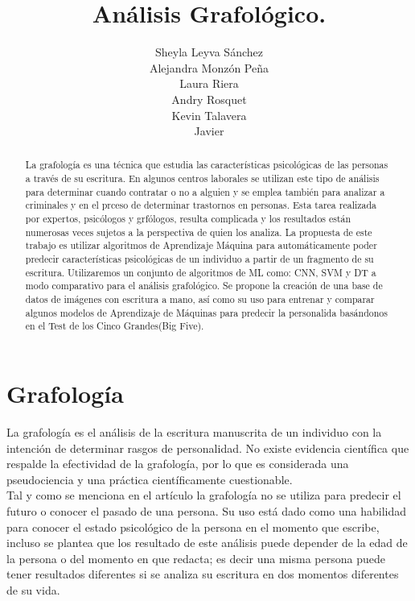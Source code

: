 \documentclass[10pt, a4paper]{article}
\begin{document}
    \title{An\'alisis Grafol\'ogico.}
    \author{Sheyla Leyva S\'anchez \\ Alejandra Monz\'on Pe\~na \\ Laura Riera \\ Andry Rosquet \\ Kevin Talavera \\ Javier}
    \date{}
    \maketitle

    \begin{abstract}
        La grafología es una técnica que estudia las características psicológicas de las personas a través de su escritura. 
        En algunos centros laborales se utilizan este tipo de análisis para determinar cuando contratar o no a alguien y se emplea también 
        para analizar a criminales y en el prceso de determinar trastornos en personas. Esta tarea realizada por expertos,
        psicólogos y grfólogos, resulta complicada y los resultados están numerosas veces sujetos a la perspectiva de quien los analiza. La propuesta de este trabajo es 
        utilizar algoritmos de Aprendizaje Máquina para automáticamente poder predecir características psicológicas de un individuo a partir de un fragmento de su escritura. 
        Utilizaremos un conjunto de algoritmos de ML como: CNN, SVM y DT a modo comparativo para el análisis grafológico. 
        Se propone la creaci\'on de una base de datos de im\'agenes con escritura a mano, as\'i como su uso para entrenar y comparar algunos modelos de Aprendizaje de M\'aquinas para predecir la personalida bas\'andonos en el Test de los Cinco Grandes(Big Five).
    \end{abstract}
    
    \section{Grafolog\'ia}
    
        La grafología es el análisis de la escritura manuscrita de un individuo con la intención de determinar rasgos de personalidad. 
        No existe evidencia científica que respalde la efectividad de la grafología, por lo que es considerada una pseudociencia 
        y una práctica científicamente cuestionable.\\ 

        Tal y como se menciona en el art\'iculo \cite{19} la grafolog\'ia no se utiliza para predecir el futuro o conocer el pasado de una persona. Su uso 
        est\'a dado como una habilidad para conocer el estado psicol\'ogico de la persona en el momento que escribe, incluso se plantea que los resultado de este an\'alisis 
        puede depender de la edad de la persona o del momento en que redacta; es decir una misma persona puede tener resultados diferentes si se analiza su escritura en dos momentos 
        diferentes de su vida.\\
\end{document}
